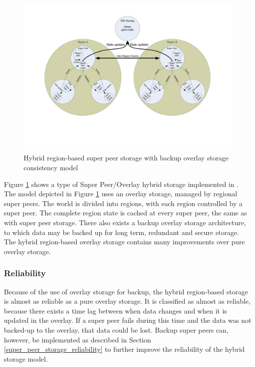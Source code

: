 \documentclass[10pt,a4paper,journal,cspaper,compsoc]{IEEEtran}
\begin{document}
\begin{figure}[htbp]
 \centering
 \includegraphics[clip=true, viewport=2cm 5cm 27cm 19.5cm, width=\textwidth]{region_based_CS_CM_P2PO}
 \caption{Hybrid region-based super peer storage with backup overlay storage consistency model}
 \label{fig_cs_region_o_cm}
\end{figure}
%
Figure \ref{fig_cs_region_o_cm} shows a type of Super Peer/Overlay hybrid storage implemented in \cite{zoned_federation}. The model depicted in
Figure \ref{fig_cs_region_o_cm} uses an overlay storage, managed by regional super peers. The world is divided into regions, with each region
controlled by a super peer. The complete region state is cached at every super peer, the same as with super peer storage. There also exists a backup
overlay storage architecture, to which data may be backed up for long term, redundant and secure storage. The hybrid region-based overlay storage
contains many improvements over pure overlay storage.

\subsubsection{Reliability}
\label{hybrid_storage_reliability}

Because of the use of overlay storage for backup, the hybrid region-based storage is almost as reliable as a pure overlay storage. It is classified
as almost as reliable, because there exists a time lag between when data changes and when it is updated in the overlay. If a super peer fails during
this time and the data was not backed-up to the overlay, that data could be lost. Backup super peers can, however, be implemented as described in
Section \ref{super_peer_storage_reliability} to further improve the reliability of the hybrid storage model.
\end{document}
